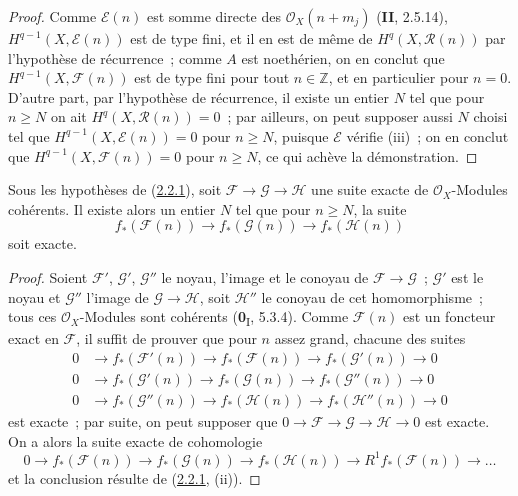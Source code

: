 \begin{proof}
Comme $\mathcal E(n)$ est somme directe des $\mathcal O_X(n+m_j)$
(\textbf{II}, 2.5.14), $H^{q-1}(X,\mathcal E(n))$ est de type fini, et il en est
de même de $H^q(X,\mathcal R(n))$ par l'hypothèse de récurrence~; comme
$A$ est noethérien, on en conclut que
$H^{q-1}(X,\mathcal F(n))$ est de type fini pour tout $n\in\mathbb Z$, et
en particulier pour $n=0$. D'autre part, par l'hypothèse de récurrence,
il existe un entier $N$ tel que pour $n\geq N$ on ait
$H^q(X,\mathcal R(n))=0$~; par ailleurs, on peut supposer aussi $N$ choisi
tel que $H^{q-1}(X,\mathcal E(n))=0$ pour $n\geq N$, puisque $\mathcal E$
vérifie (iii)~; on en conclut que
$H^{q-1}(X,\mathcal F(n))=0$ pour $n\geq N$, ce qui achève la
démonstration.
\end{proof}

\begin{corollary}[2.2.3]
\label{III.2.2.3-fr}
Sous les hypothèses de \textup{(\hyperref[III.2.2.1-fr]{2.2.1})}, soit
$\mathcal F\to\mathcal G\to\mathcal H$ une suite exacte de
$\mathcal O_X$-Modules cohérents. Il existe alors un entier $N$ tel que
pour $n\geq N$, la suite
\[
f_*(\mathcal F(n))\longrightarrow f_*(\mathcal G(n))
\longrightarrow f_*(\mathcal H(n))
\]
soit exacte.
\end{corollary}

\begin{proof}
Soient $\mathcal F'$, $\mathcal G'$, $\mathcal G''$ le noyau, l'image et
le conoyau de $\mathcal F\to\mathcal G$~; $\mathcal G'$ est le noyau et
$\mathcal G''$ l'image de $\mathcal G\to\mathcal H$, soit $\mathcal H''$
le conoyau de cet homomorphisme~; tous ces $\mathcal O_X$-Modules sont
cohérents (\textbf{0}\textsubscript{I}, 5.3.4). Comme $\mathcal F(n)$ est un
foncteur exact en $\mathcal F$, il suffit de prouver que pour $n$ assez
grand, chacune des suites
\begin{align*}
0&\longrightarrow f_*(\mathcal F'(n))
\longrightarrow f_*(\mathcal F(n))
\longrightarrow f_*(\mathcal G'(n))\longrightarrow0\\
0&\longrightarrow f_*(\mathcal G'(n))
\longrightarrow f_*(\mathcal G(n))
\longrightarrow f_*(\mathcal G''(n))\longrightarrow0\\
0&\longrightarrow f_*(\mathcal G''(n))
\longrightarrow f_*(\mathcal H(n))
\longrightarrow f_*(\mathcal H''(n))\longrightarrow0
\end{align*}
est exacte~; par suite, on peut supposer que
$0\to\mathcal F\to\mathcal G\to\mathcal H\to0$ est exacte. On a alors
la suite exacte de cohomologie
\[
0\longrightarrow f_*(\mathcal F(n))
\longrightarrow f_*(\mathcal G(n))
\longrightarrow f_*(\mathcal H(n))
\longrightarrow R^1f_*(\mathcal F(n))\longrightarrow\ldots
\]
et la conclusion résulte de (\hyperref[III.2.2.1-fr]{2.2.1}, (ii)).
\end{proof}


